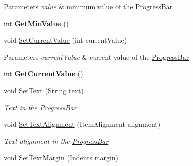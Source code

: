 \begin{DoxyCompactItemize}
\begin{DoxyCompactList}
\begin{DoxyParams}{Parameters}
{\em value} & minimum value of the \mbox{\hyperlink{class_space_v_i_l_1_1_progress_bar}{Progress\+Bar}} \\
\hline
\end{DoxyParams}
\end{DoxyCompactList}\item 
\mbox{\label{class_space_v_i_l_1_1_progress_bar_a61104b0745bda5d5a774e66915568eac}} 
int {\bfseries Get\+Min\+Value} ()
\item 
\mbox{\label{class_space_v_i_l_1_1_progress_bar_a2ac9f82582b7c30e432e65fda1624792}} 
void \mbox{\hyperlink{class_space_v_i_l_1_1_progress_bar_a2ac9f82582b7c30e432e65fda1624792}{Set\+Current\+Value}} (int current\+Value)
\begin{DoxyCompactList}\small\item\em 
\begin{DoxyParams}{Parameters}
{\em current\+Value} & current value of the \mbox{\hyperlink{class_space_v_i_l_1_1_progress_bar}{Progress\+Bar}} \\
\hline
\end{DoxyParams}
\end{DoxyCompactList}\item 
\mbox{\label{class_space_v_i_l_1_1_progress_bar_a1b629582591041d4ba0469307d488ac0}} 
int {\bfseries Get\+Current\+Value} ()
\item 
void \mbox{\hyperlink{class_space_v_i_l_1_1_progress_bar_a7e2ce10be7d00af8599913bc474c8ffc}{Set\+Text}} (String text)
\begin{DoxyCompactList}\small\item\em Text in the \mbox{\hyperlink{class_space_v_i_l_1_1_progress_bar}{Progress\+Bar}} \end{DoxyCompactList}\item 
void \mbox{\hyperlink{class_space_v_i_l_1_1_progress_bar_a283b2191a9a45bc001d5aa4d5249a7b4}{Set\+Text\+Alignment}} (Item\+Alignment alignment)
\begin{DoxyCompactList}\small\item\em Text alignment in the \mbox{\hyperlink{class_space_v_i_l_1_1_progress_bar}{Progress\+Bar}} \end{DoxyCompactList}\item 
void \mbox{\hyperlink{class_space_v_i_l_1_1_progress_bar_a8129fd305910f9acb1c0d5d177f00855}{Set\+Text\+Margin}} (\mbox{\hyperlink{struct_space_v_i_l_1_1_decorations_1_1_indents}{Indents}} margin)

\end{DoxyCompactItemize}
